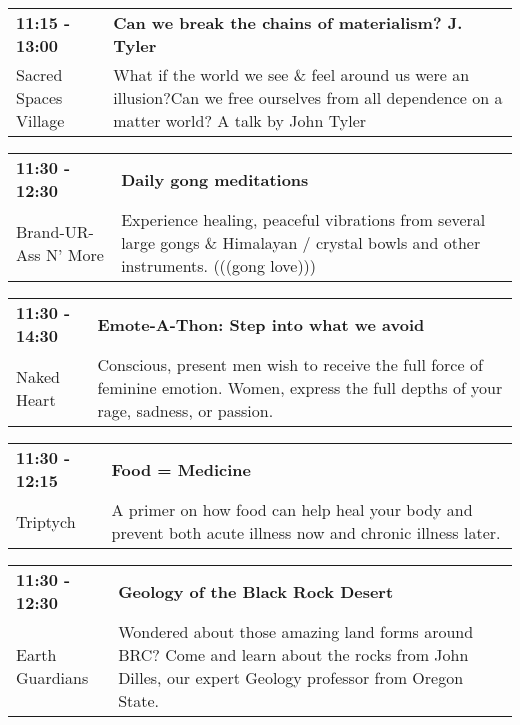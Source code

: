 \begin{tabular}{ p{1in} p{2.2in} }
    \textbf{11:15 - 13:00} & \textbf{Can we break the chains of materialism? J. Tyler} \\
    Sacred Spaces Village \newline  & What if the world we see \& feel around us were an illusion?Can we free ourselves from all dependence on a matter world? A talk by John Tyler \\
    \hline 
\end{tabular}
    
\begin{tabular}{ p{1in} p{2.2in} }
    \textbf{11:30 - 12:30} & \textbf{Daily gong meditations} \\
    Brand-UR-Ass N' More \newline  & Experience healing, peaceful vibrations from several large gongs \& Himalayan / crystal bowls and other instruments. (((gong love))) \\
    \hline 
\end{tabular}
    
\begin{tabular}{ p{1in} p{2.2in} }
    \textbf{11:30 - 14:30} & \textbf{Emote-A-Thon: Step into what we avoid} \\
    Naked Heart \newline  & Conscious, present men wish to receive the full force of feminine emotion. Women, express the full depths of your rage, sadness, or passion. \\
    \hline 
\end{tabular}
    
\begin{tabular}{ p{1in} p{2.2in} }
    \textbf{11:30 - 12:15} & \textbf{Food = Medicine} \\
    Triptych \newline  & A primer on how food can help heal your body and prevent both acute illness now and chronic illness later. \\
    \hline 
\end{tabular}
    
\begin{tabular}{ p{1in} p{2.2in} }
    \textbf{11:30 - 12:30} & \textbf{ Geology of the Black Rock Desert } \\
    Earth Guardians \newline  & Wondered about those amazing land forms around BRC? Come and learn about the rocks from John Dilles, our expert Geology professor from Oregon State. \\
    \hline 
\end{tabular}
    
